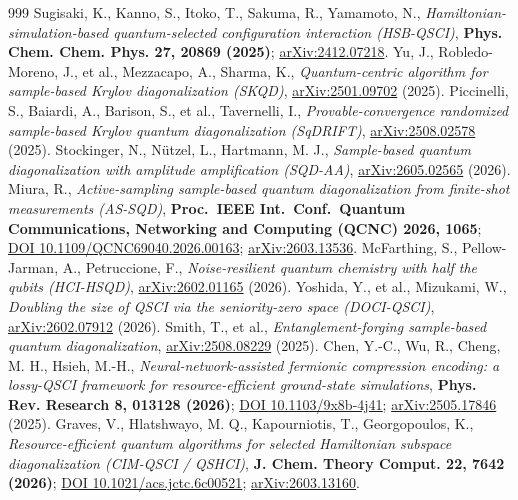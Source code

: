 \documentclass[onecolumn,a4paper]{quantumarticle}
\begin{document}
\begin{thebibliography}{999}
 Sugisaki, K., Kanno, S., Itoko, T., Sakuma, R., Yamamoto, N., \emph{Hamiltonian-simulation-based quantum-selected configuration interaction (HSB-QSCI)}, \textbf{Phys. Chem. Chem. Phys. 27, 20869 (2025)}; \href{https://arxiv.org/abs/2412.07218}{arXiv:2412.07218}.
 Yu, J., Robledo-Moreno, J., et al., Mezzacapo, A., Sharma, K., \emph{Quantum-centric algorithm for sample-based Krylov diagonalization (SKQD)}, \href{https://arxiv.org/abs/2501.09702}{arXiv:2501.09702} (2025).
 Piccinelli, S., Baiardi, A., Barison, S., et al., Tavernelli, I., \emph{Provable-convergence randomized sample-based Krylov quantum diagonalization (SqDRIFT)}, \href{https://arxiv.org/abs/2508.02578}{arXiv:2508.02578} (2025).
 Stockinger, N., Nützel, L., Hartmann, M. J., \emph{Sample-based quantum diagonalization with amplitude amplification (SQD-AA)}, \href{https://arxiv.org/abs/2605.02565}{arXiv:2605.02565} (2026).
 Miura, R., \emph{Active-sampling sample-based quantum diagonalization from finite-shot measurements (AS-SQD)}, \textbf{Proc.\ IEEE Int.\ Conf.\ Quantum Communications, Networking and Computing (QCNC) 2026, 1065}; \href{https://doi.org/10.1109/QCNC69040.2026.00163}{DOI 10.1109/QCNC69040.2026.00163}; \href{https://arxiv.org/abs/2603.13536}{arXiv:2603.13536}.
 McFarthing, S., Pellow-Jarman, A., Petruccione, F., \emph{Noise-resilient quantum chemistry with half the qubits (HCI-HSQD)}, \href{https://arxiv.org/abs/2602.01165}{arXiv:2602.01165} (2026).
 Yoshida, Y., et al., Mizukami, W., \emph{Doubling the size of QSCI via the seniority-zero space (DOCI-QSCI)}, \href{https://arxiv.org/abs/2602.07912}{arXiv:2602.07912} (2026).
 Smith, T., et al., \emph{Entanglement-forging sample-based quantum diagonalization}, \href{https://arxiv.org/abs/2508.08229}{arXiv:2508.08229} (2025).
 Chen, Y.-C., Wu, R., Cheng, M. H., Hsieh, M.-H., \emph{Neural-network-assisted fermionic compression encoding: a lossy-QSCI framework for resource-efficient ground-state simulations}, \textbf{Phys. Rev. Research 8, 013128 (2026)}; \href{https://doi.org/10.1103/9x8b-4j41}{DOI 10.1103/9x8b-4j41}; \href{https://arxiv.org/abs/2505.17846}{arXiv:2505.17846} (2025).
 Graves, V., Hlatshwayo, M. Q., Kapourniotis, T., Georgopoulos, K., \emph{Resource-efficient quantum algorithms for selected Hamiltonian subspace diagonalization (CIM-QSCI / QSHCI)}, \textbf{J. Chem. Theory Comput. 22, 7642 (2026)}; \href{https://doi.org/10.1021/acs.jctc.6c00521}{DOI 10.1021/acs.jctc.6c00521}; \href{https://arxiv.org/abs/2603.13160}{arXiv:2603.13160}.

\end{thebibliography}
\end{document}
